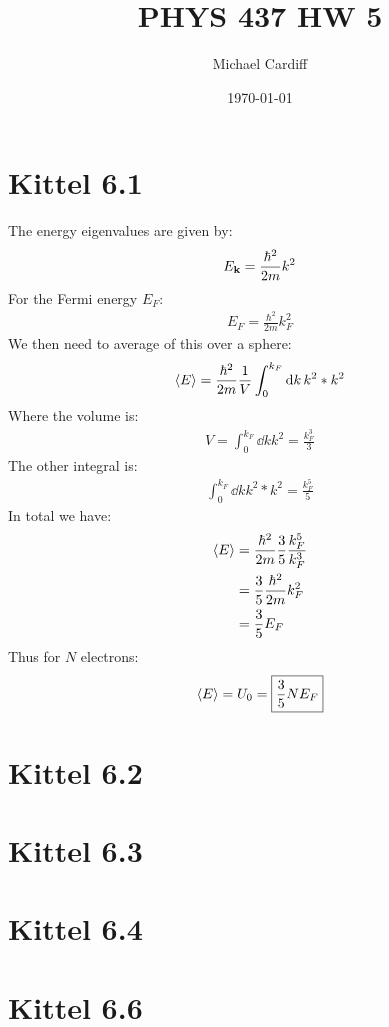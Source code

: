 \documentclass[12pt]{article}
\title{\vspace{-3em}PHYS 437 HW 5}
\author{Michael Cardiff}
\date{\today}
\begin{document}
\maketitle
\section*{Kittel 6.1}
The energy eigenvalues are given by:
\begin{align*}
  E_{\vb{k}}=\frac{\hbar^2}{2m}k^2
\end{align*}
For the Fermi energy $E_F$:
\begin{align*}
  E_F=\frac{\hbar^2}{2m}k^2_F
\end{align*}
We then need to average of this over a sphere:
\begin{align*}
  \ev{E}=\frac{\hbar^2}{2m}\frac{1}{V}\int_0^{k_F}\dd{k}k^2*k^2
\end{align*}
Where the volume is:
\begin{align*}
  V=\int_0^{k_F}\dd{k}k^2=\frac{k_F^3}{3}
\end{align*}
The other integral is:
\begin{align*}
  \int_0^{k_F}\dd{k}k^2*k^2=\frac{k_F^5}{5}
\end{align*}
In total we have:
\begin{align*}
  \ev{E}&=\frac{\hbar^2}{2m}\frac{3}{5}\frac{k_F^5}{k_F^3}\\
  &=\frac{3}{5}\frac{\hbar^2}{2m}k_F^2\\
  &=\frac{3}{5}E_F
\end{align*}
Thus for $N$ electrons:
\begin{align*}
  \ev{E}=U_0=\boxed{\frac{3}{5}NE_F}
\end{align*}
\section*{Kittel 6.2}

\section*{Kittel 6.3}

\section*{Kittel 6.4}

\section*{Kittel 6.6}
\end{document}
